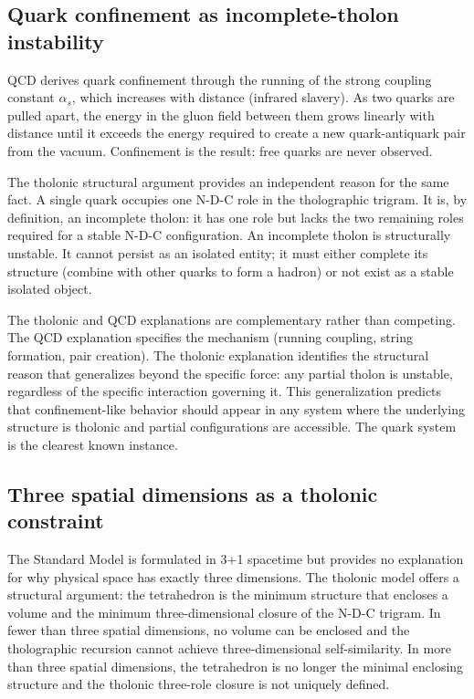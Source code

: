 \documentclass[12pt]{article}
\begin{document}
\subsection{Quark confinement as incomplete-tholon instability}\label{quark-confinement-as-incomplete-tholon-instability}

QCD derives quark confinement through the running of the strong coupling
constant \(\alpha_s\), which increases with distance (infrared slavery).
As two quarks are pulled apart, the energy in the gluon field between
them grows linearly with distance until it exceeds the energy required
to create a new quark-antiquark pair from the vacuum. Confinement is the
result: free quarks are never observed.

The tholonic structural argument provides an independent reason for the
same fact. A single quark occupies one N-D-C role in the tholographic
trigram. It is, by definition, an incomplete tholon: it has one role but
lacks the two remaining roles required for a stable N-D-C configuration.
An incomplete tholon is structurally unstable. It cannot persist as an
isolated entity; it must either complete its structure (combine with
other quarks to form a hadron) or not exist as a stable isolated object.

The tholonic and QCD explanations are complementary rather than
competing. The QCD explanation specifies the mechanism (running
coupling, string formation, pair creation). The tholonic explanation
identifies the structural reason that generalizes beyond the specific
force: any partial tholon is unstable, regardless of the specific
interaction governing it. This generalization predicts that
confinement-like behavior should appear in any system where the
underlying structure is tholonic and partial configurations are
accessible. The quark system is the clearest known instance.

\subsection{Three spatial dimensions as a tholonic constraint}\label{three-spatial-dimensions-as-a-tholonic-constraint}

The Standard Model is formulated in 3+1 spacetime but provides no
explanation for why physical space has exactly three dimensions. The
tholonic model offers a structural argument: the tetrahedron is the
minimum structure that encloses a volume and the minimum
three-dimensional closure of the N-D-C trigram. In fewer than three
spatial dimensions, no volume can be enclosed and the tholographic
recursion cannot achieve three-dimensional self-similarity. In more than
three spatial dimensions, the tetrahedron is no longer the minimal
enclosing structure and the tholonic three-role closure is not uniquely
defined.
\end{document}
